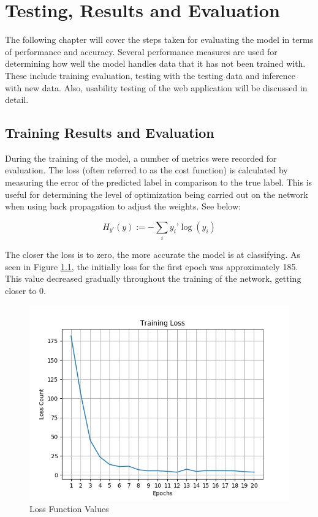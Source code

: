 \chapter{Testing, Results and Evaluation}
The following chapter will cover the steps taken for evaluating the model in terms of performance and accuracy. Several performance measures are used for determining how well the model handles data that it has not been trained with. These include training evaluation, testing with the testing data and inference with new data. Also, usability testing of the web application will be discussed in detail.

\section{Training Results and Evaluation}
During the training of the model, a number of metrics were recorded for evaluation. The loss (often referred to as the cost function) is calculated by measuring the error of the predicted label in comparison to the true label. This is useful for determining the level of optimization being carried out on the network when using back propagation to adjust the weights. See below: 
 
\[H_{y’} (y) := - \sum_{i} y_{i}’ \log (y_i)\]

The closer the loss is to zero, the more accurate the model is at classifying. As seen in Figure \ref{loss}, the initially loss for the first epoch was approximately 185. This value decreased gradually throughout the training of the network, getting closer to 0.

\begin{figure}[ht]
	\begin{center}
		\advance\leftskip-3cm
		\advance\rightskip-3cm
		\includegraphics[keepaspectratio=true,scale=0.7]{__resources/Results/loss.jpg}
		\caption{Loss Function Values}
		\label{loss}
	\end{center}
\end{figure}

